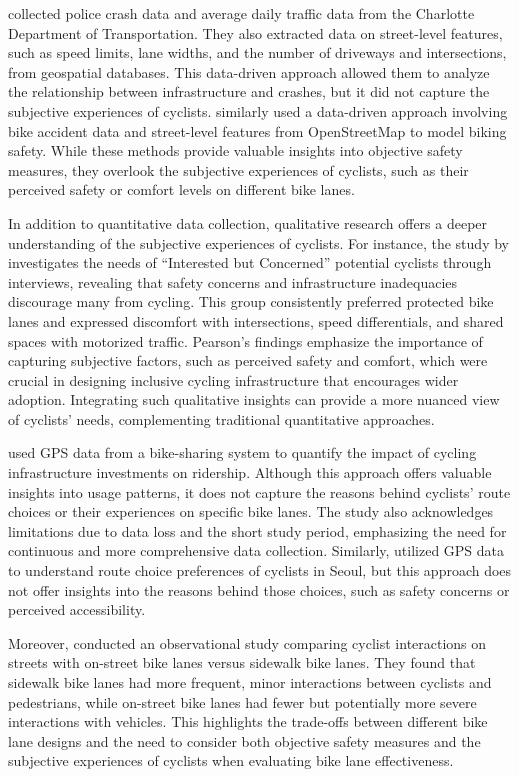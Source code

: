 \citet{Pulugurtha:2015} collected police crash data and average daily traffic data from the Charlotte Department of Transportation. They also extracted data on street-level features, such as speed limits, lane widths, and the number of driveways and intersections, from geospatial databases. This data-driven approach allowed them to analyze the relationship between infrastructure and crashes, but it did not capture the subjective experiences of cyclists. \citet{Daraei:2021} similarly used a data-driven approach involving bike accident data and street-level features from OpenStreetMap to model biking safety. While these methods provide valuable insights into objective safety measures, they overlook the subjective experiences of cyclists, such as their perceived safety or comfort levels on different bike lanes.

In addition to quantitative data collection, qualitative research offers a deeper understanding of the subjective experiences of cyclists. For instance, the study by \citet{Pearson2024} investigates the needs of “Interested but Concerned” potential cyclists through interviews, revealing that safety concerns and infrastructure inadequacies discourage many from cycling. This group consistently preferred protected bike lanes and expressed discomfort with intersections, speed differentials, and shared spaces with motorized traffic. Pearson's findings emphasize the importance of capturing subjective factors, such as perceived safety and comfort, which were crucial in designing inclusive cycling infrastructure that encourages wider adoption. Integrating such qualitative insights can provide a more nuanced view of cyclists' needs, complementing traditional quantitative approaches. 

\citet{Veghel:2024} used GPS data from a bike-sharing system to quantify the impact of cycling infrastructure investments on ridership. Although this approach offers valuable insights into usage patterns, it does not capture the reasons behind cyclists' route choices or their experiences on specific bike lanes. The study also acknowledges limitations due to data loss and the short study period, emphasizing the need for continuous and more comprehensive data collection. Similarly, \citet{Chung:2024} utilized GPS data to understand route choice preferences of cyclists in Seoul, but this approach does not offer insights into the reasons behind those choices, such as safety concerns or perceived accessibility.

Moreover, \citet{Silva:2023} conducted an observational study comparing cyclist interactions on streets with on-street bike lanes versus sidewalk bike lanes. They found that sidewalk bike lanes had more frequent, minor interactions between cyclists and pedestrians, while on-street bike lanes had fewer but potentially more severe interactions with vehicles. This highlights the trade-offs between different bike lane designs and the need to consider both objective safety measures and the subjective experiences of cyclists when evaluating bike lane effectiveness.

